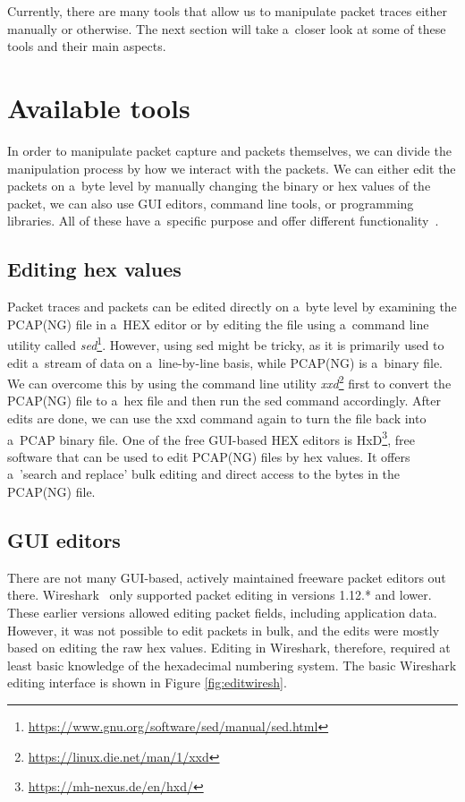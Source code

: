 \documentclass[
  printed,     %
  color,       %
  oneside,     %
  nosansbold,  %
  nocolorbold, %
  nolof,         %
  nolot,         %
]{fithesis4}
\begin{document}
Currently, there are many tools that allow us to manipulate packet traces either manually or otherwise. The next section will take a~closer look at some of these tools and their main aspects.


\section{Available tools}

In order to manipulate packet capture and packets themselves, we can divide the manipulation process by how we interact with the packets. We can either edit the packets on a~byte level by manually changing the binary or hex values of the packet, we can also use GUI editors, command line tools, or programming libraries. All of these have a~specific purpose and offer different functionality~\cite{Howcanne5:online}.

\subsection{Editing hex values}

Packet traces and packets can be edited directly on a~byte level by examining the PCAP(NG) file in a~HEX editor or by editing the file using a~command line utility called \textit{sed}\footnote{\url{https://www.gnu.org/software/sed/manual/sed.html}}. However, using sed might be tricky, as it is primarily used to edit a~stream of data on a~line-by-line basis, while PCAP(NG) is a~binary file. We can overcome this by using the command line utility \textit{xxd}\footnote{\url{https://linux.die.net/man/1/xxd}} first to convert the PCAP(NG) file to a~hex file and then run the sed command accordingly. After edits are done, we can use the xxd command again to turn the file back into a~PCAP binary file. One of the free GUI-based HEX editors is HxD\footnote{\url{https://mh-nexus.de/en/hxd/}}, free software that can be used to edit PCAP(NG) files by hex values. It offers a~'search and replace' bulk editing and direct access to the bytes in the PCAP(NG) file.

\subsection{GUI editors}

There are not many GUI-based, actively maintained freeware packet editors out there. Wireshark~\cite{Wireshar89:online} only supported packet editing in versions 1.12.* and lower. These earlier versions allowed editing packet fields, including application data. However, it was not possible to edit packets in bulk, and the edits were mostly based on editing the raw hex values. Editing in Wireshark, therefore, required at least basic knowledge of the hexadecimal numbering system. The basic Wireshark editing interface is shown in Figure \ref{fig:editwiresh}.
\end{document}
